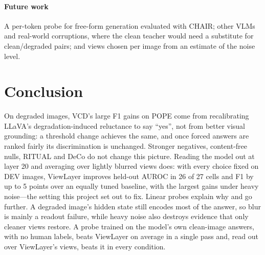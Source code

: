 \documentclass[10pt,a4paper]{article}
\newcommand{\ours}{ViewLayer}
\begin{document}
\paragraph{Future work} A per-token probe for free-form generation evaluated with CHAIR; other VLMs and real-world corruptions, where the clean teacher would need a substitute for clean/degraded pairs; and views chosen per image from an estimate of the noise level.

\section{Conclusion}
On degraded images, VCD's large F1 gains on POPE come from recalibrating LLaVA's degradation-induced reluctance to say ``yes'', not from better visual grounding: a threshold change achieves the same, and once forced answers are ranked fairly its discrimination is unchanged. Stronger negatives, content-free nulls, RITUAL and DeCo do not change this picture. Reading the model out at layer 20 and averaging over lightly blurred views does: with every choice fixed on DEV images, \ours{} improves held-out AUROC in 26 of 27 cells and F1 by up to 5 points over an equally tuned baseline, with the largest gains under heavy noise---the setting this project set out to fix. Linear probes explain why and go further. A degraded image's hidden state still encodes most of the answer, so blur is mainly a readout failure, while heavy noise also destroys evidence that only cleaner views restore. A probe trained on the model's own clean-image answers, with no human labels, beats \ours{} on average in a single pass and, read out over \ours{}'s views, beats it in every condition.

\end{document}
